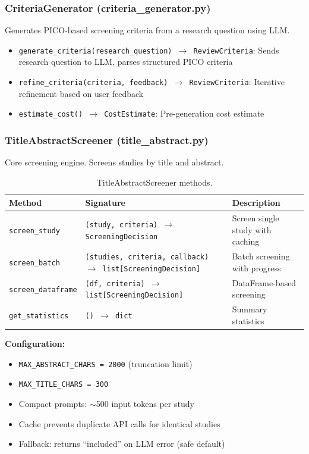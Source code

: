 \documentclass[11pt,a4paper]{article}
\begin{document}
\subsubsection{CriteriaGenerator (criteria\_generator.py)}

Generates PICO-based screening criteria from a research question using LLM.

\begin{itemize}[nosep]
  \item \texttt{generate\_criteria(research\_question) $\to$ ReviewCriteria}: Sends research question to LLM, parses structured PICO criteria
  \item \texttt{refine\_criteria(criteria, feedback) $\to$ ReviewCriteria}: Iterative refinement based on user feedback
  \item \texttt{estimate\_cost() $\to$ CostEstimate}: Pre-generation cost estimate
\end{itemize}

\subsubsection{TitleAbstractScreener (title\_abstract.py)}

Core screening engine. Screens studies by title and abstract.

\begin{table}[H]
\centering\small
\begin{tabular}{p{4cm}p{4cm}p{5cm}}
\toprule
\textbf{Method} & \textbf{Signature} & \textbf{Description} \\
\midrule
\texttt{screen\_study} & \texttt{(study, criteria) $\to$ ScreeningDecision} & Screen single study with caching \\
\texttt{screen\_batch} & \texttt{(studies, criteria, callback) $\to$ list[ScreeningDecision]} & Batch screening with progress \\
\texttt{screen\_dataframe} & \texttt{(df, criteria) $\to$ list[ScreeningDecision]} & DataFrame-based screening \\
\texttt{get\_statistics} & \texttt{() $\to$ dict} & Summary statistics \\
\bottomrule
\end{tabular}
\caption{TitleAbstractScreener methods.}
\end{table}

\textbf{Configuration:}
\begin{itemize}[nosep]
  \item \texttt{MAX\_ABSTRACT\_CHARS = 2000} (truncation limit)
  \item \texttt{MAX\_TITLE\_CHARS = 300}
  \item Compact prompts: $\sim$500 input tokens per study
  \item Cache prevents duplicate API calls for identical studies
  \item Fallback: returns ``included'' on LLM error (safe default)
\end{itemize}
\end{document}
